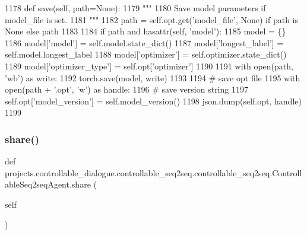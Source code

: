 \begin{DoxyCode}
1178     \textcolor{keyword}{def }save(self, path=None):
1179         \textcolor{stringliteral}{"""}
1180 \textcolor{stringliteral}{        Save model parameters if model\_file is set.}
1181 \textcolor{stringliteral}{        """}
1182         path = self.opt.get(\textcolor{stringliteral}{'model\_file'}, \textcolor{keywordtype}{None}) \textcolor{keywordflow}{if} path \textcolor{keywordflow}{is} \textcolor{keywordtype}{None} \textcolor{keywordflow}{else} path
1183 
1184         \textcolor{keywordflow}{if} path \textcolor{keywordflow}{and} hasattr(self, \textcolor{stringliteral}{'model'}):
1185             model = \{\}
1186             model[\textcolor{stringliteral}{'model'}] = self.model.state\_dict()
1187             model[\textcolor{stringliteral}{'longest\_label'}] = self.model.longest\_label
1188             model[\textcolor{stringliteral}{'optimizer'}] = self.optimizer.state\_dict()
1189             model[\textcolor{stringliteral}{'optimizer\_type'}] = self.opt[\textcolor{stringliteral}{'optimizer'}]
1190 
1191             with open(path, \textcolor{stringliteral}{'wb'}) \textcolor{keyword}{as} write:
1192                 torch.save(model, write)
1193 
1194             \textcolor{comment}{# save opt file}
1195             with open(path + \textcolor{stringliteral}{'.opt'}, \textcolor{stringliteral}{'w'}) \textcolor{keyword}{as} handle:
1196                 \textcolor{comment}{# save version string}
1197                 self.opt[\textcolor{stringliteral}{'model\_version'}] = self.model\_version()
1198                 json.dump(self.opt, handle)
1199 
\end{DoxyCode}
\mbox{\label{classprojects_1_1controllable__dialogue_1_1controllable__seq2seq_1_1controllable__seq2seq_1_1ControllableSeq2seqAgent_ae9da32042638a1a69fe2911ad42d4d08}} 
\subsubsection{\texorpdfstring{share()}{share()}}
{\footnotesize\ttfamily def projects.\+controllable\+\_\+dialogue.\+controllable\+\_\+seq2seq.\+controllable\+\_\+seq2seq.\+Controllable\+Seq2seq\+Agent.\+share (\begin{DoxyParamCaption}\item[{}]{self }\end{DoxyParamCaption})}

